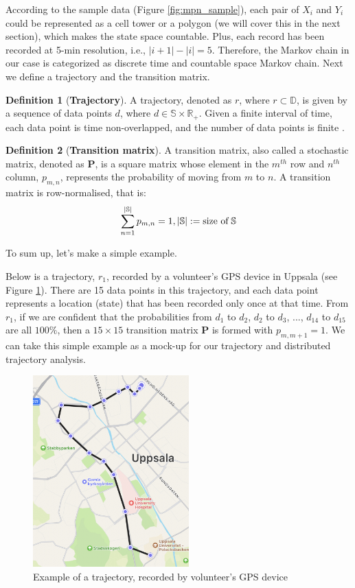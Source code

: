 \documentclass[12pt]{article}
\theoremstyle{definition}
\newtheorem{definition}{Definition}[section]
\begin{document}
According to the sample data (Figure \ref{fig:mpn_sample}), each pair of \(X_i\) and \(Y_i\) could be represented as a cell tower or a polygon (we will cover this in the next section), which makes the state space countable. Plus, each record has been recorded at 5-min resolution, i.e., \(|i+1|-|i| = 5\). Therefore, the Markov chain in our case is categorized as discrete time and countable space Markov chain. Next we define a trajectory and the transition matrix.

\begin{definition}[\textbf{Trajectory}]
  \label{def:traj}
  A trajectory, denoted as \(r\), where \(r \subset \mathbb{D}\), is given by a sequence of data points \(d\), where \(d \in \mathbb{S} \times \mathbb{R_{+}}\). Given a finite interval of time, each data point is time non-overlapped, and the number of data points is finite \cite{privacy_traj_co-traj_2019}.
\end{definition}

\begin{definition}[\textbf{Transition matrix}]
  A transition matrix, also called a stochastic matrix, denoted as \textbf{P}, is a square matrix whose element in the \(m^{th}\) row and \(n^{th}\) column, \(p_{m,n}\), represents the probability of moving from \(m\) to \(n\). A transition matrix is row-normalised, that is:
  \[ \sum_{n=1}^{\left| \mathbb{S} \right|} p_{m,n} = 1, \left| \mathbb{S} \right|:= \textnormal{size of}\; \mathbb{S} \]
\end{definition} 

To sum up, let’s make a simple example. 

Below is a trajectory, \(r_1\), recorded by a volunteer's GPS device in Uppsala (see Figure \ref{fig:rand_traj_uppsala}). There are 15 data points in this trajectory, and each data point represents a location (state) that has been recorded only once at that time. From \(r_1\), if we are confident that the probabilities from \(d_1\) to \(d_2\), \(d_2\) to \(d_3\), ..., \(d_{14}\) to \(d_{15}\) are all \(100\%\), then a \(15 \times 15\) transition matrix \textbf{P} is formed with \(p_{m,m+1}=1\). We can take this simple example as a mock-up for our trajectory and distributed trajectory analysis.

\newpage

\begin{figure}
  \centering
  \includegraphics[width=6cm]{rand_traj_uppsala.jpg}
  \caption{Example of a trajectory, recorded by volunteer's GPS device}
  \label{fig:rand_traj_uppsala}
\end{figure}
\end{document}
